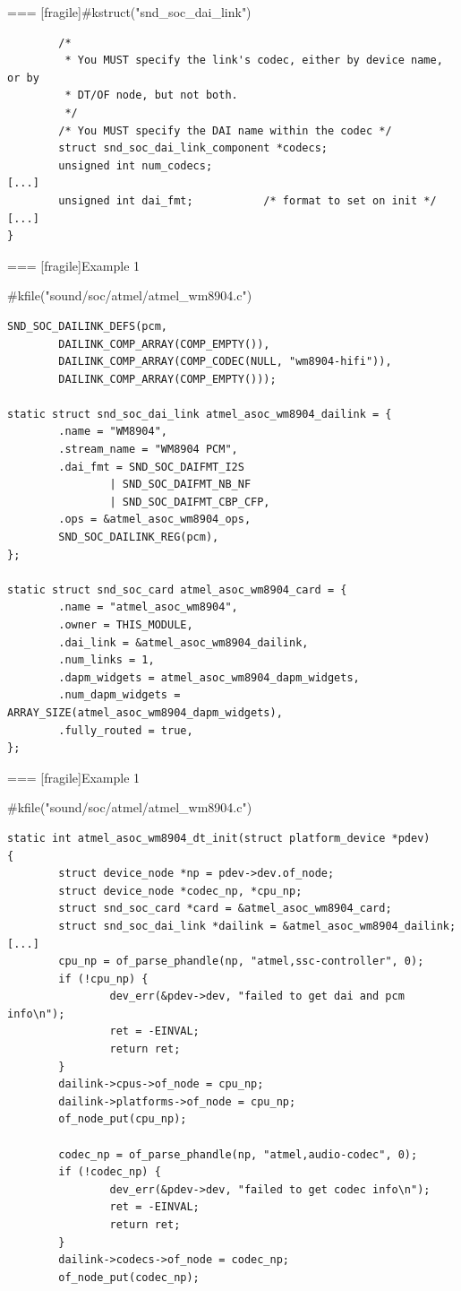 === [fragile]{#kstruct("snd_soc_dai_link")}
  \begin{block}{}
    \fontsize{10}{10}\selectfont
    \begin{verbatim}
        /*
         * You MUST specify the link's codec, either by device name, or by
         * DT/OF node, but not both.
         */
        /* You MUST specify the DAI name within the codec */
        struct snd_soc_dai_link_component *codecs;
        unsigned int num_codecs;
[...]
        unsigned int dai_fmt;           /* format to set on init */
[...]
}
    \end{verbatim}
  \end{block}


=== [fragile]{Example 1}
  \begin{block}{#kfile("sound/soc/atmel/atmel_wm8904.c")}
    \fontsize{8}{8}\selectfont
    \begin{verbatim}
SND_SOC_DAILINK_DEFS(pcm,
        DAILINK_COMP_ARRAY(COMP_EMPTY()),
        DAILINK_COMP_ARRAY(COMP_CODEC(NULL, "wm8904-hifi")),
        DAILINK_COMP_ARRAY(COMP_EMPTY()));

static struct snd_soc_dai_link atmel_asoc_wm8904_dailink = {
        .name = "WM8904",
        .stream_name = "WM8904 PCM",
        .dai_fmt = SND_SOC_DAIFMT_I2S
                | SND_SOC_DAIFMT_NB_NF
                | SND_SOC_DAIFMT_CBP_CFP,
        .ops = &atmel_asoc_wm8904_ops,
        SND_SOC_DAILINK_REG(pcm),
};

static struct snd_soc_card atmel_asoc_wm8904_card = {
        .name = "atmel_asoc_wm8904",
        .owner = THIS_MODULE,
        .dai_link = &atmel_asoc_wm8904_dailink,
        .num_links = 1,
        .dapm_widgets = atmel_asoc_wm8904_dapm_widgets,
        .num_dapm_widgets = ARRAY_SIZE(atmel_asoc_wm8904_dapm_widgets),
        .fully_routed = true,
};
    \end{verbatim}
  \end{block}


=== [fragile]{Example 1}
  \begin{block}{#kfile("sound/soc/atmel/atmel_wm8904.c")}
    \fontsize{8}{8}\selectfont
    \begin{verbatim}
static int atmel_asoc_wm8904_dt_init(struct platform_device *pdev)
{
        struct device_node *np = pdev->dev.of_node;
        struct device_node *codec_np, *cpu_np;
        struct snd_soc_card *card = &atmel_asoc_wm8904_card;
        struct snd_soc_dai_link *dailink = &atmel_asoc_wm8904_dailink;
[...]
        cpu_np = of_parse_phandle(np, "atmel,ssc-controller", 0);
        if (!cpu_np) {
                dev_err(&pdev->dev, "failed to get dai and pcm info\n");
                ret = -EINVAL;
                return ret;
        }
        dailink->cpus->of_node = cpu_np;
        dailink->platforms->of_node = cpu_np;
        of_node_put(cpu_np);

        codec_np = of_parse_phandle(np, "atmel,audio-codec", 0);
        if (!codec_np) {
                dev_err(&pdev->dev, "failed to get codec info\n");
                ret = -EINVAL;
                return ret;
        }
        dailink->codecs->of_node = codec_np;
        of_node_put(codec_np);
    \end{verbatim}
  \end{block}



